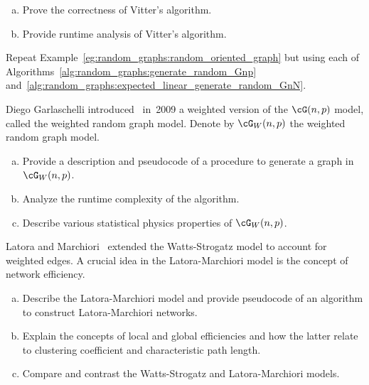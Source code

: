 \begin{problem}
\begin{enumerate}[(a)]
  \item Prove the correctness of Vitter's algorithm.

  \item Provide runtime analysis of Vitter's algorithm.
  \end{enumerate}

\item Repeat Example~\ref{eg:random_graphs:random_oriented_graph} but
  using each of Algorithms~\ref{alg:random_graphs:generate_random_Gnp}
  and~\ref{alg:random_graphs:expected_linear_generate_random_GnN}.

\item Diego Garlaschelli
  introduced~\cite{Garlaschelli2009} in~2009 a weighted version of the
  $\cG(n,p)$ model, called the weighted
  random graph model. Denote by $\cG_W(n,p)$ the weighted random graph
  model.
  \begin{enumerate}[(a)]
  \item Provide a description and pseudocode of a procedure to
    generate a graph in $\cG_W(n,p)$.

  \item Analyze the runtime complexity of the algorithm.

  \item Describe various statistical physics properties of $\cG_W(n,p)$.
  \end{enumerate}

\item Latora and
  Marchiori~\cite{LatoraMarchiori2003} extended
  the Watts-Strogatz model to account for
  weighted edges. A crucial idea in the
  Latora-Marchiori model is the concept
  of network efficiency.
  \begin{enumerate}[(a)]
  \item Describe the Latora-Marchiori model and provide pseudocode of
    an algorithm to construct Latora-Marchiori networks.

  \item Explain the concepts of local and global efficiencies and how
    the latter relate to clustering coefficient and characteristic
    path length.

  \item Compare and contrast the Watts-Strogatz and Latora-Marchiori
    models.
  \end{enumerate}
\end{problem}
